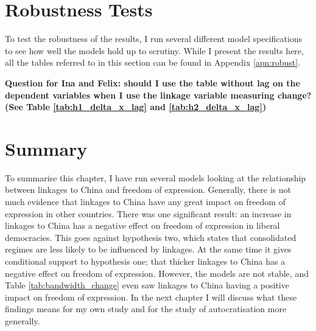 \section{Robustness Tests} \label{sec:robust}
To test the robustness of the results, I run several different model specifications to see how well the models hold up to scrutiny. While I present the results here, all the tables referred to in this section can be found in Appendix \ref{apn:robust}. 

\textbf{Question for Ina and Felix: should I use the table without lag on the dependent variables when I use the linkage variable measuring change? (See Table \ref{tab:h1_delta_x_lag} and \ref{tab:h2_delta_x_lag})}

\section{Summary}
To summarise this chapter, I have run several models looking at the relationship between linkages to China and freedom of expression. Generally, there is not much evidence that linkages to China have any great impact on freedom of expression in other countries. There was one significant result: an increase in linkages to China has a negative effect on freedom of expression in liberal democracies. This goes against hypothesis two, which states that consolidated regimes are less likely to be influenced by linkages. At the same time it gives conditional support to hypothesis one; that thicker linkages to China has a negative effect on freedom of expression. However, the models are not stable, and Table \ref{tab:bandwidth_change} even saw linkages to China having a positive impact on freedom of expression. In the next chapter I will discuss what these findings means for my own study and for the study of autocratisation more generally.